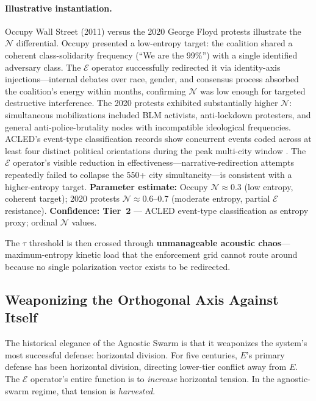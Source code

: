 \paragraph{Illustrative instantiation.}
Occupy Wall Street (2011) versus the 2020 George Floyd protests illustrate the $\mathcal{N}$ differential. Occupy presented a low-entropy target: the coalition shared a coherent class-solidarity frequency (``We are the 99\%'') with a single identified adversary class. The $\mathcal{E}$ operator successfully redirected it via identity-axis injections---internal debates over race, gender, and consensus process absorbed the coalition's energy within months, confirming $\mathcal{N}$ was low enough for targeted destructive interference. The 2020 protests exhibited substantially higher $\mathcal{N}$: simultaneous mobilizations included BLM activists, anti-lockdown protesters, and general anti-police-brutality nodes with incompatible ideological frequencies. ACLED's event-type classification records show concurrent events coded across at least four distinct political orientations during the peak multi-city window \cite{acled_us_2020}. The $\mathcal{E}$ operator's visible reduction in effectiveness---narrative-redirection attempts repeatedly failed to collapse the 550+ city simultaneity---is consistent with a higher-entropy target. \textbf{Parameter estimate:} Occupy $\mathcal{N} \approx 0.3$ (low entropy, coherent target); 2020 protests $\mathcal{N} \approx 0.6$--0.7 (moderate entropy, partial $\mathcal{E}$ resistance). \textbf{Confidence: Tier~2} --- ACLED event-type classification as entropy proxy; ordinal $\mathcal{N}$ values.

The $\tau$ threshold is then crossed through \textbf{unmanageable acoustic chaos}---maximum-entropy kinetic load that the enforcement grid cannot route around because no single polarization vector exists to be redirected.

\subsection{Weaponizing the Orthogonal Axis Against Itself}

The historical elegance of the Agnostic Swarm is that it weaponizes the system's most successful defense: horizontal division. For five centuries, $E$'s primary defense has been horizontal division, directing lower-tier conflict away from $E$. The $\mathcal{E}$ operator's entire function is to \textit{increase} horizontal tension. In the agnostic-swarm regime, that tension is \textit{harvested}.

